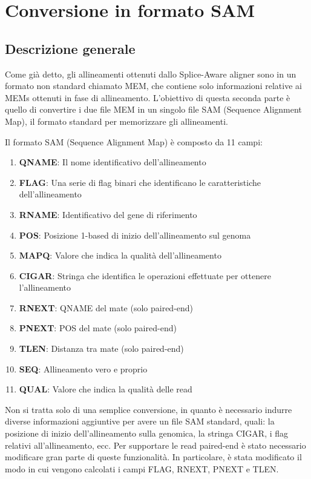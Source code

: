 \section{Conversione in formato SAM}

\subsection{Descrizione generale}
Come già detto, gli allineamenti ottenuti dallo Splice-Aware aligner sono in un formato non standard chiamato MEM, che contiene solo informazioni relative ai MEMs ottenuti in fase di allineamento. L'obiettivo di questa seconda parte è quello di convertire i due file MEM in un singolo file SAM (Sequence Alignment Map), il formato standard per memorizzare gli allineamenti.

Il formato SAM (Sequence Alignment Map) è composto da 11 campi:

\begin{enumerate}
	\item \textbf{QNAME}: Il nome identificativo dell'allineamento
	\item \textbf{FLAG}: Una serie di flag binari che identificano le caratteristiche dell'allineamento
	\item \textbf{RNAME}: Identificativo del gene di riferimento
	\item \textbf{POS}: Posizione 1-based di inizio dell'allineamento sul genoma
	\item \textbf{MAPQ}:  Valore che indica la qualità dell'allineamento
	\item \textbf{CIGAR}: Stringa che identifica le operazioni effettuate per ottenere l'allineamento
	\item \textbf{RNEXT}: QNAME del mate (solo paired-end)
	\item \textbf{PNEXT}: POS del mate	(solo paired-end)
	\item \textbf{TLEN}:  Distanza tra mate (solo paired-end)
	\item \textbf{SEQ}:  	Allineamento vero e proprio
	\item \textbf{QUAL}: Valore che indica la qualità delle read
\end{enumerate}

Non si tratta solo di una semplice conversione, in quanto è necessario indurre diverse informazioni aggiuntive per avere un file SAM standard, quali: la posizione di inizio dell'allineamento sulla genomica, la stringa CIGAR, i flag relativi all'allineamento, ecc. Per supportare le read paired-end è stato necessario modificare gran parte di queste funzionalità. In particolare, è stata modificato il modo in cui vengono calcolati i campi FLAG, RNEXT, PNEXT e TLEN.

